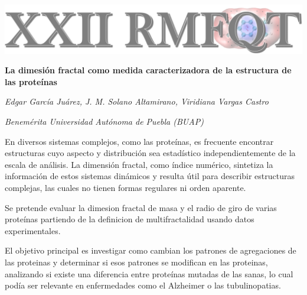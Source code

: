 \documentclass[11pt,a4paper]{letter}
\begin{document}
\begin{center}
\includegraphics{rmfqt-2024}
\end{center}
\vspace{0.5cm}
\begin{center}
{\bfseries\LARGE La dimesión fractal como medida caracterizadora de la estructura de las proteínas \par}
\vspace{0.5cm}
{\itshape\Large Edgar García Juárez, J. M. Solano Altamirano, Viridiana Vargas Castro \par}
{\itshape\Large Benemérita Universidad Autónoma de Puebla (BUAP) \par}
\end{center}
\vspace{0.5cm}
\onehalfspacing %



En diversos sistemas complejos, como las proteínas, es frecuente encontrar estructuras cuyo aspecto y distribución  sea estadístico independientemente de la escala de análisis. La dimensión fractal, como índice numérico, sintetiza la información de estos sistemas dinámicos y resulta útil para describir estructuras complejas, las cuales no tienen formas regulares ni orden aparente.


Se pretende evaluar la dimesion fractal de masa y el radio de giro de varias proteínas partiendo de la definicion de multifractalidad usando datos experimentales.

El objetivo principal es investigar como cambian los patrones de agregaciones de las proteinas y determinar si esos patrones se modifican en las proteinas, analizando si existe una diferencia entre proteínas mutadas de las sanas, lo cual podía ser relevante en enfermedades como el Alzheimer o las tubulinopatias.
\end{document}
